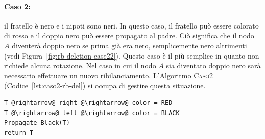 \paragraph{Caso 2:} il fratello è nero e i nipoti sono neri. In questo caso, il fratello può essere colorato di rosso e il doppio nero può essere propagato al padre. Ciò significa che il nodo $A$ diventerà doppio nero se prima già era nero, semplicemente nero altrimenti (vedi Figura~\ref{fig:rb-deletion-case22}). Questo caso è il più semplice in quanto non richiede alcuna rotazione. Nel caso in cui il nodo $A$ sia diventato doppio nero sarà necessario effettuare un nuovo ribilanciamento. L'Algoritmo \textsc{Caso2} (Codice~\ref{lst:caso2-rb-del}) si occupa di gestire questa situazione.
\begin{lstlisting}[language=asd,caption={Caso2(T)},label=lst:caso2-rb-del]
T @rightarrow@ right @\rightarrow@ color = RED
T @\rightarrow@ left @\rightarrow@ color = BLACK
Propagate-Black(T)
return T
\end{lstlisting}
